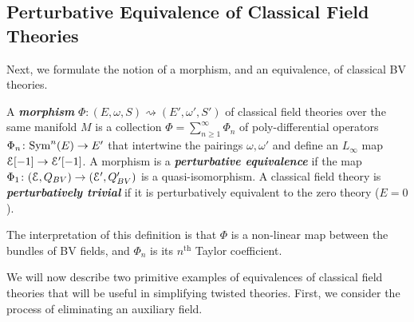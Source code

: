 \documentclass[10pt, oneside]{article}
\newcommand{\defterm}[1]{\textbf{\emph{#1}}}
\begin{document}
\subsection{Perturbative Equivalence of Classical Field Theories}

Next, we formulate the notion of a morphism, and an equivalence, of classical BV theories. 

\begin{definition}
A \defterm{morphism} $\Phi\colon (E, \omega, S)\rightsquigarrow (E', \omega', S')$ of classical field theories over the same manifold $M$ is a collection $\Phi =\sum_{n\geq 1}^\infty \Phi_n$ of poly-differential operators $\Phi_n\colon {\rm Sym}^n(E)\rightarrow E'$ that intertwine the pairings $\omega, \omega'$ and define an $L_\infty$ map $\mathcal E[-1]\rightarrow \mathcal E'[-1]$. A morphism is a \defterm{perturbative equivalence} if the map $\Phi_1\colon (\mathcal E, Q_{BV})\rightarrow (\mathcal E', Q'_{BV})$ is a quasi-isomorphism. A classical field theory is \defterm{perturbatively trivial} if it is perturbatively equivalent to the zero theory ($E = 0$).
\label{def:perturbativeequivalence}
\end{definition}

The interpretation of this definition is that $\Phi$ is a non-linear map between the bundles of BV fields, and $\Phi_n$ is its $n^{\text{th}}$ Taylor coefficient.

We will now describe two primitive examples of equivalences of classical field theories that will be useful in simplifying twisted theories. 
First, we consider the process of eliminating an auxiliary field.
\end{document}

